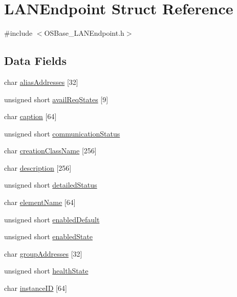 \hypertarget{struct_l_a_n_endpoint}{
\section{LANEndpoint Struct Reference}
\label{struct_l_a_n_endpoint}
}


{\ttfamily \#include $<$OSBase\_\-LANEndpoint.h$>$}\subsection*{Data Fields}
\begin{DoxyCompactItemize}
\item 
char \hyperlink{struct_l_a_n_endpoint_a6e449a03fbae5586b7160c04823501fc}{aliasAddresses} \mbox{[}32\mbox{]}
\item 
unsigned short \hyperlink{struct_l_a_n_endpoint_a5a2be46ec1bec0e3aadd7ad393df3860}{availReqStates} \mbox{[}9\mbox{]}
\item 
char \hyperlink{struct_l_a_n_endpoint_aedfd9c5424c9aa2ef6df1a16f9220d6f}{caption} \mbox{[}64\mbox{]}
\item 
unsigned short \hyperlink{struct_l_a_n_endpoint_a17887524776f566e094b52c5dd5ec5f5}{communicationStatus}
\item 
char \hyperlink{struct_l_a_n_endpoint_a264b859577affb8c648bb0dea4f42a76}{creationClassName} \mbox{[}256\mbox{]}
\item 
char \hyperlink{struct_l_a_n_endpoint_a18afc38b5c05344b661e1b3b01c1d0e5}{description} \mbox{[}256\mbox{]}
\item 
unsigned short \hyperlink{struct_l_a_n_endpoint_ad90b9e45caede4967b5412b9f8be047c}{detailedStatus}
\item 
char \hyperlink{struct_l_a_n_endpoint_a1c9372777e720027e94df62b3274a7fb}{elementName} \mbox{[}64\mbox{]}
\item 
unsigned short \hyperlink{struct_l_a_n_endpoint_af4231713a84892d0f772d1bdfc8b541f}{enabledDefault}
\item 
unsigned short \hyperlink{struct_l_a_n_endpoint_a719c20be3591f4cfad2db11f3410fe10}{enabledState}
\item 
char \hyperlink{struct_l_a_n_endpoint_a6aaad4baebd4dfe5c0fc50f4dc89655d}{groupAddresses} \mbox{[}32\mbox{]}
\item 
unsigned short \hyperlink{struct_l_a_n_endpoint_abe815d40163da155690cb848f45d5c5a}{healthState}
\item 
char \hyperlink{struct_l_a_n_endpoint_a9c118b2dca982f7e028eac6ce61f473d}{instanceID} \mbox{[}64\mbox{]}

\end{DoxyCompactItemize}
